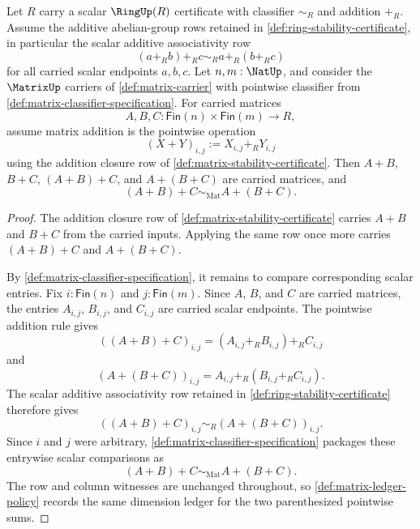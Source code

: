 \begin{theorem}
\label{thm:matrix-addition-associativity-from-scalar-additive-associativity}
Let $R$ carry a scalar $\RingUp(R)$ certificate with classifier $\sim_R$ and addition $+_R$. Assume the additive abelian-group rows retained in \autoref{def:ring-stability-certificate}, in particular the scalar additive associativity row
$$
(a+_R b)+_R c\sim_R a+_R(b+_R c)
$$
for all carried scalar endpoints $a,b,c$. Let $n,m:\NatUp$, and consider the $\MatrixUp$ carriers of \autoref{def:matrix-carrier} with pointwise classifier from \autoref{def:matrix-classifier-specification}. For carried matrices
$$
A,B,C:\mathsf{Fin}(n)\times\mathsf{Fin}(m)\to R,
$$
assume matrix addition is the pointwise operation
$$
(X+Y)_{i,j}:=X_{i,j}+_R Y_{i,j}
$$
using the addition closure row of \autoref{def:matrix-stability-certificate}. Then $A+B$, $B+C$, $(A+B)+C$, and $A+(B+C)$ are carried matrices, and
$$
(A+B)+C\sim_{\mathrm{Mat}}A+(B+C).
$$
\end{theorem}
\begin{proof}
The addition closure row of \autoref{def:matrix-stability-certificate} carries $A+B$ and $B+C$ from the carried inputs. Applying the same row once more carries $(A+B)+C$ and $A+(B+C)$.

By \autoref{def:matrix-classifier-specification}, it remains to compare corresponding scalar entries. Fix $i:\mathsf{Fin}(n)$ and $j:\mathsf{Fin}(m)$. Since $A$, $B$, and $C$ are carried matrices, the entries $A_{i,j}$, $B_{i,j}$, and $C_{i,j}$ are carried scalar endpoints. The pointwise addition rule gives
$$
((A+B)+C)_{i,j}=(A_{i,j}+_R B_{i,j})+_R C_{i,j}
$$
and
$$
(A+(B+C))_{i,j}=A_{i,j}+_R(B_{i,j}+_R C_{i,j}).
$$
The scalar additive associativity row retained in \autoref{def:ring-stability-certificate} therefore gives
$$
((A+B)+C)_{i,j}\sim_R(A+(B+C))_{i,j}.
$$
Since $i$ and $j$ were arbitrary, \autoref{def:matrix-classifier-specification} packages these entrywise scalar comparisons as
$$
(A+B)+C\sim_{\mathrm{Mat}}A+(B+C).
$$
The row and column witnesses are unchanged throughout, so \autoref{def:matrix-ledger-policy} records the same dimension ledger for the two parenthesized pointwise sums.
\end{proof}
